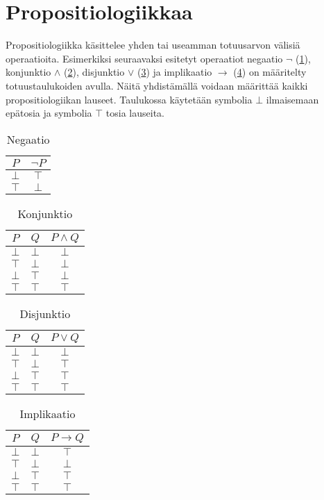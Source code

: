 \documentclass[a4paper,12pt]{amsart}
\begin{document}
\section{Propositiologiikkaa}
Propositiologiikka käsittelee yhden tai useamman totuusarvon välisiä operaatioita. Esimerkiksi seuraavaksi esitetyt operaatiot negaatio $\lnot$ (\ref{negaatio}), konjunktio $\land$ (\ref{konjunktio}), disjunktio $\lor$ (\ref{disjunktio}) ja implikaatio $\to$ (\ref{implikaatio}) on määritelty totuustaulukoiden avulla. Näitä yhdistämällä voidaan määrittää kaikki propositiologiikan lauseet. Taulukossa käytetään symbolia $\bot$ ilmaisemaan epätosia ja symbolia $\top$ tosia lauseita.

\begin{table}
\caption{Negaatio}
\begin{tabular}{c|c}
$P$ & $\lnot P$ \\
\hline
\hline
$\bot$ & $\top$ \\
\hline
$\top$ & $\bot$
\end{tabular}
\label{negaatio}
\end{table}

\begin{table}
\caption{Konjunktio}
\begin{tabular}{c|c|c}
$P$ & $Q$ & $P \land Q$ \\
\hline
\hline
$\bot$ & $\bot$ & $\bot$ \\
\hline
$\top$ & $\bot$ & $\bot$ \\
\hline
$\bot$ & $\top$ & $\bot$ \\
\hline
$\top$ & $\top$ & $\top$ \\
\end{tabular}
\label{konjunktio}
\end{table}

\begin{table}
\caption{Disjunktio}
\begin{tabular}{c|c|c}
$P$ & $Q$ & $P \lor Q$ \\
\hline
\hline
$\bot$ & $\bot$ & $\bot$ \\
\hline
$\top$ & $\bot$ & $\top$ \\
\hline
$\bot$ & $\top$ & $\top$ \\
\hline
$\top$ & $\top$ & $\top$ \\
\end{tabular}
\label{disjunktio}
\end{table}

\begin{table}
\caption{Implikaatio}
\begin{tabular}{c|c|c}
$P$ & $Q$ & $P \to Q$ \\
\hline
\hline
$\bot$ & $\bot$ & $\top$ \\
\hline
$\top$ & $\bot$ & $\bot$ \\
\hline
$\bot$ & $\top$ & $\top$ \\
\hline
$\top$ & $\top$ & $\top$ \\
\end{tabular}
\label{implikaatio}
\end{table}
\end{document}
